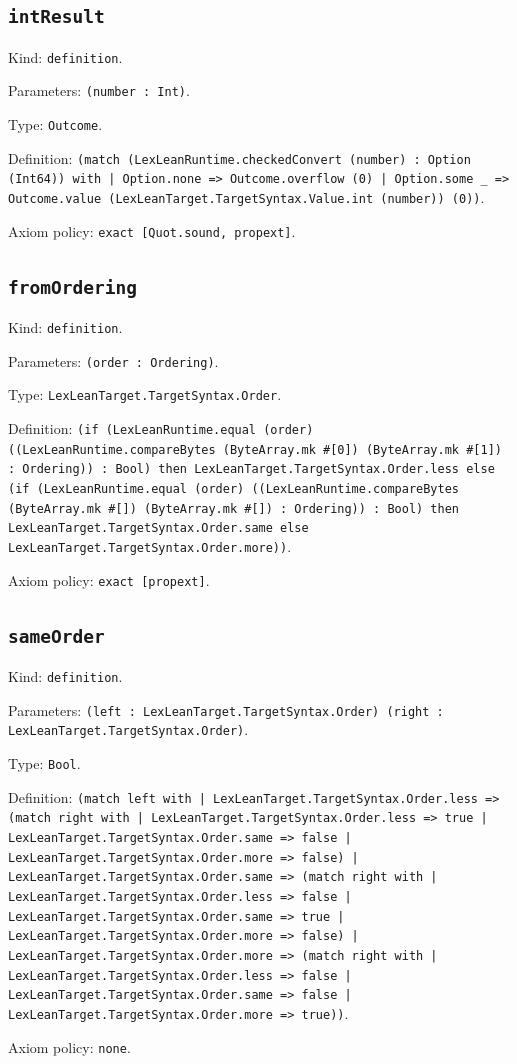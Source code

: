 \documentclass[11pt]{article}
\begin{document}
\subsection*{\texttt{intResult}}
\noindent Kind: \texttt{definition}.\par
\noindent Parameters: \texttt{(number : Int)}.\par
\noindent Type: \texttt{Outcome}.\par
\noindent Definition: \texttt{(match (LexLeanRuntime.checkedConvert (number) : Option (Int64)) with | Option.none => Outcome.overflow (0) | Option.some \_ => Outcome.value (LexLeanTarget.TargetSyntax.Value.int (number)) (0))}.\par
\noindent Axiom policy: \texttt{exact [Quot.sound, propext]}.\par
\subsection*{\texttt{fromOrdering}}
\noindent Kind: \texttt{definition}.\par
\noindent Parameters: \texttt{(order : Ordering)}.\par
\noindent Type: \texttt{LexLeanTarget.TargetSyntax.Order}.\par
\noindent Definition: \texttt{(if (LexLeanRuntime.equal (order) ((LexLeanRuntime.compareBytes (ByteArray.mk \#[0]) (ByteArray.mk \#[1]) : Ordering)) : Bool) then LexLeanTarget.TargetSyntax.Order.less else (if (LexLeanRuntime.equal (order) ((LexLeanRuntime.compareBytes (ByteArray.mk \#[]) (ByteArray.mk \#[]) : Ordering)) : Bool) then LexLeanTarget.TargetSyntax.Order.same else LexLeanTarget.TargetSyntax.Order.more))}.\par
\noindent Axiom policy: \texttt{exact [propext]}.\par
\subsection*{\texttt{sameOrder}}
\noindent Kind: \texttt{definition}.\par
\noindent Parameters: \texttt{(left : LexLeanTarget.TargetSyntax.Order) (right : LexLeanTarget.TargetSyntax.Order)}.\par
\noindent Type: \texttt{Bool}.\par
\noindent Definition: \texttt{(match left with | LexLeanTarget.TargetSyntax.Order.less => (match right with | LexLeanTarget.TargetSyntax.Order.less => true | LexLeanTarget.TargetSyntax.Order.same => false | LexLeanTarget.TargetSyntax.Order.more => false) | LexLeanTarget.TargetSyntax.Order.same => (match right with | LexLeanTarget.TargetSyntax.Order.less => false | LexLeanTarget.TargetSyntax.Order.same => true | LexLeanTarget.TargetSyntax.Order.more => false) | LexLeanTarget.TargetSyntax.Order.more => (match right with | LexLeanTarget.TargetSyntax.Order.less => false | LexLeanTarget.TargetSyntax.Order.same => false | LexLeanTarget.TargetSyntax.Order.more => true))}.\par
\noindent Axiom policy: \texttt{none}.\par
\end{document}
